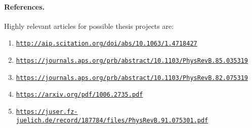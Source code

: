 \documentclass[%
oneside,                 %
final,                   %
10pt]{article}
\begin{document}
\paragraph{References.}
Highly relevant articles for possible thesis projects are:

\begin{enumerate}
\item \href{{http://aip.scitation.org/doi/abs/10.1063/1.4718427}}{\nolinkurl{http://aip.scitation.org/doi/abs/10.1063/1.4718427}}

\item \href{{https://journals.aps.org/prb/abstract/10.1103/PhysRevB.85.035319}}{\nolinkurl{https://journals.aps.org/prb/abstract/10.1103/PhysRevB.85.035319}}

\item \href{{https://journals.aps.org/prb/abstract/10.1103/PhysRevB.82.075319}}{\nolinkurl{https://journals.aps.org/prb/abstract/10.1103/PhysRevB.82.075319}}

\item \href{{https://arxiv.org/pdf/1006.2735.pdf}}{\nolinkurl{https://arxiv.org/pdf/1006.2735.pdf}}

\item \href{{https://juser.fz-juelich.de/record/187784/files/PhysRevB.91.075301.pdf}}{\nolinkurl{https://juser.fz-juelich.de/record/187784/files/PhysRevB.91.075301.pdf}}
\end{enumerate}

\noindent

\end{document}
